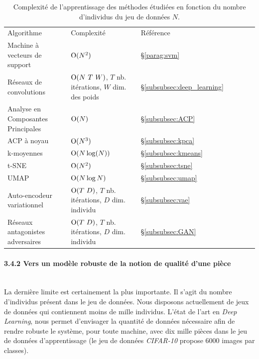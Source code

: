\begin{table}[bhtp]
	\centering
	\begin{tabular}{|l|l|l|l|l|l|l|}
		\arrayrulecolor{black}
		\hhline{---}
		Algorithme  & Complexité & Référence\\
		\hhline{=:=:=:} %
		Machine à vecteurs de support      & $\operatorname{O}(N^2)$        & §\ref{parag:svm} \\ \hline
		Réseaux de convolutions & $\bigO(N \ T \ W)$, $T$ nb. itérations, $W$ dim. des poids & §\ref{subsubsec:deep_learning}\\
		\hhline{=:=:=:} %
		Analyse en Composantes Principales & $\operatorname{O}(N)$          & §\ref{subsubsec:ACP}\\ \hline
		ACP à noyau                        & $\operatorname{O}(N^3)$        & §\ref{subsubsec:kpca}\\
		\hhline{=:=:=:}
		k-moyennes                         & $\operatorname{O}(N \log(N))$  & §\ref{subsubsec:kmeans} \\ \hline
		t-SNE                              & $\operatorname{O}(N^2)$        & §\ref{subsubsec:tsne}\\ \hline
		UMAP                               & $\operatorname{O}(N \log N)$   & §\ref{subsubsec:umap}\\ \hline
		Auto-encodeur variationnel        & $\bigO(T \ D)$, $T$ nb. itérations, $D$ dim. individu  & §\ref{subsubsec:vae}\\ \hline
		Réseaux antagonistes adversaires   & $\bigO(T \ D)$, $T$ nb. itérations, $D$ dim. individu & §\ref{subsubsec:GAN}\\ \hline
	\end{tabular}
	\caption{Complexité de l'apprentissage des méthodes étudiées en fonction du nombre d'individus du jeu de données $N$.}
	\label{tab:overview}
\end{table}

\paragraph{3.4.2 Vers un modèle robuste de la notion de qualité d'une pièce} \mbox{} \\
La dernière limite est certainement la plus importante.
Il s'agit du nombre d'individus présent dans le jeu de données.
Nous disposons actuellement de jeux de données qui contiennent moins de mille individus.
L’état de l’art en \textit{Deep Learning}, nous permet d’envisager la quantité de données nécessaire afin de rendre robuste le système, pour toute machine, avec dix mille pièces dans le jeu de données d’apprentissage (le jeu de données \textit{CIFAR-10} \cite{krizhevsky2009learning} propose 6000 images par classes).

